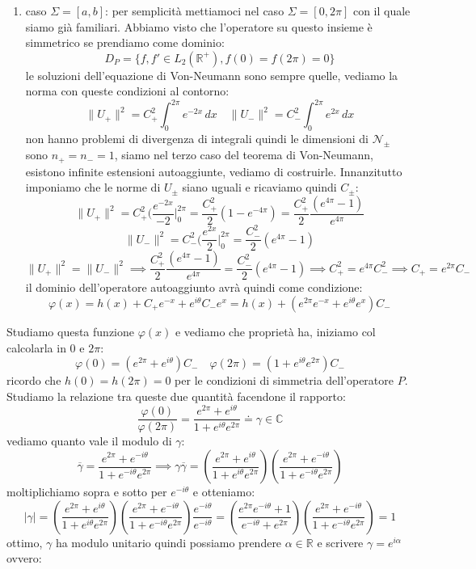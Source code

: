\documentclass[12pt]{book}
\theoremstyle{plain}
\newcommand{\R}{\mathbb{R}}
\newcommand{\C}{\mathbb{C}}
\theoremstyle{definition}
\theoremstyle{remark}
\begin{document}
\begin{enumerate}
\item caso $\Sigma = [a,b]$:
per semplicità mettiamoci nel caso $\Sigma =[0,2\pi]$ con il quale siamo già familiari. Abbiamo visto che l'operatore su questo insieme è simmetrico se prendiamo come dominio:
\[D_P = \{f,f'\in L_2(\R^+), f(0)=f(2\pi)=0\}\]
le soluzioni dell'equazione di Von-Neumann sono sempre quelle, vediamo la norma con queste condizioni al contorno:
\[\|U_+\|^2 = C_+^2 \int_{0}^{2\pi} e^{-2x}\,dx \quad \|U_-\|^2 = C_-^2 \int_{0}^{2\pi} e^{2x}\,dx\]
non hanno problemi di divergenza di integrali quindi le dimensioni di $\mathcal{N}_\pm$ sono $n_+=n_-=1$, siamo nel terzo caso del teorema di Von-Neumann, esistono infinite estensioni autoaggiunte, vediamo di costruirle. Innanzitutto imponiamo che le norme di $U_\pm$ siano uguali e ricaviamo quindi $C_\pm$:
\[\|U_+\|^2 = C_+^2\Big(\frac{e^{-2x}}{-2}\Big|_0^{2\pi} = \frac{C_+^2}{2}(1-e^{-4\pi}) =\frac{C_+^2}{2}\frac{(e^{4\pi}-1)}{e^{4\pi}} \]
\[\|U_-\|^2 = C_-^2\Big(\frac{e^{2x}}{2}\Big|_0^{2\pi} = \frac{C_-^2}{2}(e^{4\pi}-1) \]
\[\|U_+\|^2 =\|U_-\|^2 \implies \frac{C_+^2}{2}\frac{(e^{4\pi}-1)}{e^{4\pi}} = \frac{C_-^2}{2}(e^{4\pi}-1) \implies C_+^2 = e^{4\pi}C_-^2 \implies C_+=e^{2\pi}C_- \]
il dominio dell'operatore autoaggiunto avrà quindi come condizione:
\[ \varphi(x) = h(x) +C_+e^{-x} + e^{i\theta}C_-e^{x} = h(x) + (e^{2\pi}e^{-x} + e^{i\theta}e^x)C_- \]
\end{enumerate} 
Studiamo questa funzione $\varphi(x)$ e vediamo che proprietà ha, iniziamo col calcolarla in 0 e $2\pi$:
\[\varphi(0) = (e^{2\pi} + e^{i\theta})C_-\quad \varphi(2\pi) = (1+e^{i\theta}e^{2\pi})C_-\]
ricordo che $h(0)=h(2\pi) = 0$ per le condizioni di simmetria dell'operatore $P$. Studiamo la relazione tra queste due quantità facendone il rapporto:
\[\frac{\varphi(0)}{\varphi(2\pi)} = \frac{e^{2\pi} + e^{i\theta}}{1+e^{i\theta}e^{2\pi}} \doteq \gamma \in \C\]
vediamo quanto vale il modulo di $\gamma$:
\[\overline{\gamma} = \frac{e^{2\pi} + e^{-i\theta}}{1+e^{-i\theta}e^{2\pi}}\implies \gamma\overline{\gamma} = \left(\frac{e^{2\pi} + e^{i\theta}}{1+e^{i\theta}e^{2\pi}}\right)\left(\frac{e^{2\pi} + e^{-i\theta}}{1+e^{-i\theta}e^{2\pi}}\right)\]
moltiplichiamo sopra e sotto per $e^{-i\theta}$ e otteniamo:
\[|\gamma| =\left(\frac{e^{2\pi} + e^{i\theta}}{1+e^{i\theta}e^{2\pi}}\right)\left(\frac{e^{2\pi} + e^{-i\theta}}{1+e^{-i\theta}e^{2\pi}}\right)\frac{e^{-i\theta}}{e^{-i\theta}} = \left(\frac{e^{2\pi}e^{-i\theta} + 1}{e^{-i\theta}+e^{2\pi}}\right)\left(\frac{e^{2\pi} + e^{-i\theta}}{1+e^{-i\theta}e^{2\pi}}\right) = 1\]
ottimo, $\gamma$ ha modulo unitario quindi possiamo prendere $\alpha \in\R$ e scrivere $\gamma = e^{i\alpha}$ ovvero:
\end{document}

